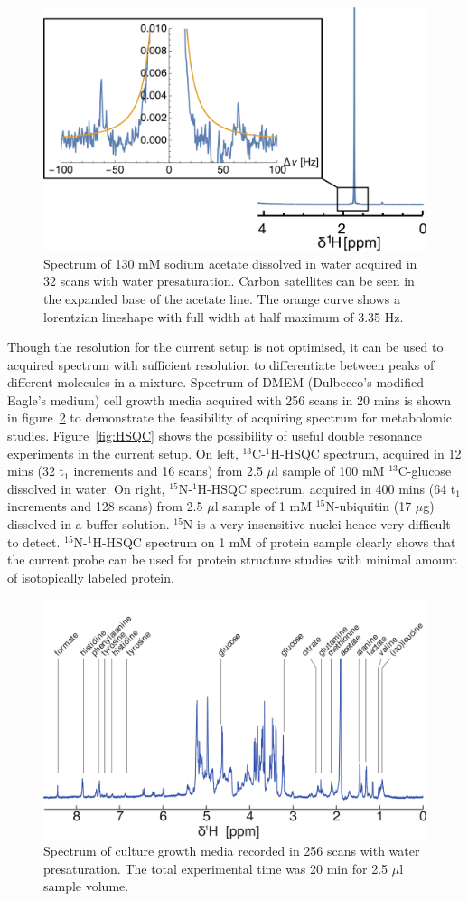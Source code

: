 \documentclass[preprint,12pt]{article}
\begin{document}
\begin{figure}
\centering
\includegraphics[width=.7\linewidth,keepaspectratio=true]{./figures/lineshape.png} 
\caption{Spectrum of 130 mM sodium acetate dissolved in water acquired in 32 scans with water presaturation. Carbon satellites can be seen in the expanded base of the acetate line. The orange curve shows a lorentzian lineshape with full width at half maximum of 3.35 Hz.}
\label{fig:lineshape} 
\end{figure}
Though the resolution for the current setup is not optimised, it can be used to acquired spectrum with sufficient resolution to differentiate between peaks of different molecules in a mixture. Spectrum of DMEM (Dulbecco's modified Eagle's medium) cell growth media acquired with 256 scans in 20 mins is shown in figure~\ref{fig:media-spec} to demonstrate the feasibility of acquiring spectrum for metabolomic studies. Figure~\ref{fig:HSQC} shows the possibility of useful double resonance experiments in the current setup. On left, $^{13}$C-$^{1}$H-HSQC spectrum, acquired in 12 mins (32 t$_1$ increments and 16 scans) from 2.5 $\mu$l sample of 100 mM $^{13}$C-glucose dissolved in water. On right, $^{15}$N-$^{1}$H-HSQC spectrum, acquired in 400 mins (64 t$_1$ increments and 128 scans) from 2.5 $\mu$l sample of 1 mM $^{15}$N-ubiquitin (17 $\mu$g) dissolved in a buffer solution. $^{15}$N is a very insensitive nuclei hence very difficult to detect. $^{15}$N-$^{1}$H-HSQC spectrum on 1 mM of protein sample clearly shows that the current probe can be used for protein structure studies with minimal amount of isotopically labeled protein.\par
\begin{figure}
\centering
\includegraphics[width=.7\linewidth,keepaspectratio=true]{./figures/media-180125-005-bigger-font.png} 
\caption{Spectrum of culture growth media recorded in 256 scans with water presaturation. The total experimental time was 20 min for 2.5 $\mu$l sample volume.}
\label{fig:media-spec} 
\end{figure}
\end{document}
